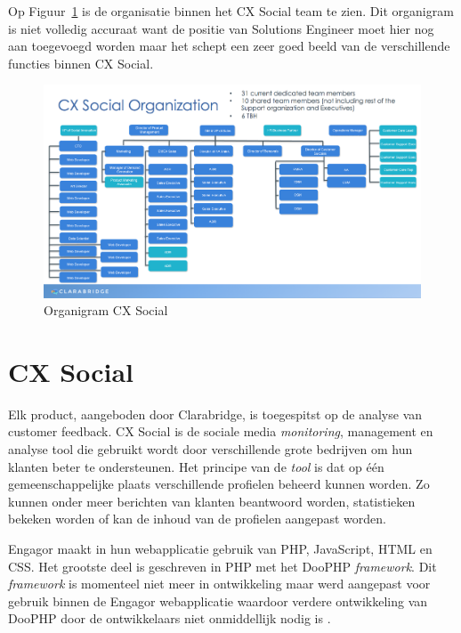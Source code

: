 Op Figuur~\ref{fig:Organigram} is de organisatie binnen het CX Social team te zien. Dit organigram is niet volledig accuraat want de positie van Solutions Engineer moet hier nog aan toegevoegd worden maar het schept een zeer goed beeld van de verschillende functies binnen CX Social. 

\begin{figure}[H]
	\centering
	\includegraphics[width=1\textwidth]{Figuren/Organigram.png}
	\caption{Organigram CX Social} %
	\label{fig:Organigram}
\end{figure} 

\section{\textbf{CX Social}} \label{CXSocial}
Elk product, aangeboden door Clarabridge, is toegespitst op de analyse van customer feedback. CX Social is de sociale media \textit{monitoring}, management en analyse tool die gebruikt wordt door verschillende grote bedrijven om hun klanten beter te ondersteunen. Het principe van de \textit{tool} is dat op \'{e}\'{e}n gemeenschappelijke plaats verschillende profielen beheerd kunnen worden. Zo kunnen onder meer berichten van klanten beantwoord worden, statistieken bekeken worden of kan de inhoud van de profielen aangepast worden. 

Engagor maakt in hun webapplicatie gebruik van PHP, JavaScript, HTML en CSS. Het grootste deel is geschreven in PHP met het DooPHP \textit{framework}. Dit \textit{framework} is momenteel niet meer in ontwikkeling maar werd aangepast voor gebruik binnen de Engagor webapplicatie waardoor verdere ontwikkeling van DooPHP door de ontwikkelaars niet onmiddellijk nodig is \cite{DooPHP}. %

